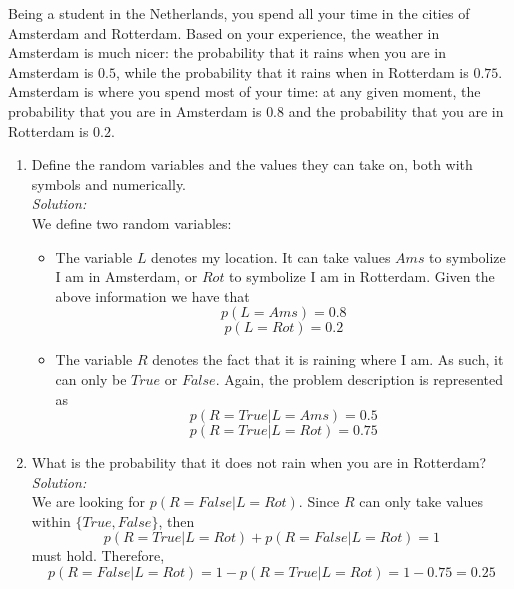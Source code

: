 \documentclass{../amsml}
\begin{document}

\begin{problem}
Being a student in the Netherlands, you spend all your time in the cities of Amsterdam and Rotterdam. Based on your experience, the weather in Amsterdam is much nicer: the probability that it rains when you are in Amsterdam is $0.5$, while the probability that it rains when in Rotterdam is $0.75$. Amsterdam is where you spend most of your time: at any given moment, the probability that you are in Amsterdam is $0.8$ and the probability that you are in Rotterdam is $0.2$.	
	
\begin{enumerate}
	\item Define the random variables and the values they can take on, both with symbols and numerically. \\
		\emph{Solution:} \\
			We define two random variables:
			\begin{itemize}
				\item The variable $L$ denotes my location. It can take values $Ams$ to symbolize I am in Amsterdam, or $Rot$ to symbolize I am in Rotterdam. Given the above information we have that 
				\begin{equation} \label{eq:pOfAms}
					p(L=Ams) = 0.8
				\end{equation}  				
				\begin{equation} \label{eq:pOfRot}
					p(L=Rot) = 0.2
				\end{equation}
				\item The variable $R$ denotes the fact that it is raining where I am. As such, it can only be $True$ or $False$. Again, the problem description is represented as 
				\begin{equation} \label{eq: pOfRainAms}
					p(R=True | L = Ams) = 0.5
				\end{equation}
				\begin{equation} \label{eq: pOfRainRot}
					p(R=True | L = Rot) = 0.75
				\end{equation}
			\end{itemize}
			
	\item What is the probability that it does not rain when you are in Rotterdam? \\
		\emph{Solution:} \\
			We are looking for $p(R=False | L= Rot)$. Since $R$ can only take values within $\{True, False\}$, then
			\begin{displaymath}
				p(R=True | L = Rot) + p(R=False | L = Rot) = 1
			\end{displaymath}
			must hold. Therefore,
			\begin{displaymath}
				p(R=False | L = Rot) = 1 - p(R=True | L = Rot) = 1 - 0.75 = 0.25
			\end{displaymath}
			 

\end{enumerate}
\end{problem}
\end{document}
